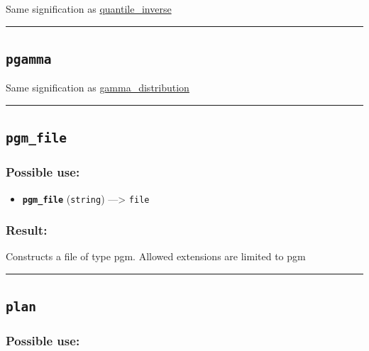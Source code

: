 \documentclass[]{book}
\providecommand{\tightlist}{%
  \setlength{\itemsep}{0pt}\setlength{\parskip}{0pt}}
\theoremstyle{definition}
\theoremstyle{definition}
\theoremstyle{definition}
\theoremstyle{remark}
\begin{document}
Same signification as
\href{operators-n-to-r.html\#quantile_inverse}{quantile\_inverse}

\begin{center}\rule{0.5\linewidth}{\linethickness}\end{center}

\subsection{\texorpdfstring{\texttt{pgamma}}{pgamma}}\label{pgamma}

Same signification as
\href{operators-d-to-h.html\#gamma_distribution}{gamma\_distribution}

\begin{center}\rule{0.5\linewidth}{\linethickness}\end{center}

\subsection{\texorpdfstring{\texttt{pgm\_file}}{pgm\_file}}\label{pgm_file}

\subsubsection{Possible use:}\label{possible-use-399}

\begin{itemize}
\tightlist
\item
  \textbf{\texttt{pgm\_file}} (\texttt{string}) ---\textgreater{}
  \texttt{file}
\end{itemize}

\subsubsection{Result:}\label{result-385}

Constructs a file of type pgm. Allowed extensions are limited to pgm

\begin{center}\rule{0.5\linewidth}{\linethickness}\end{center}

\subsection{\texorpdfstring{\texttt{plan}}{plan}}\label{plan}

\subsubsection{Possible use:}\label{possible-use-400}
\end{document}
